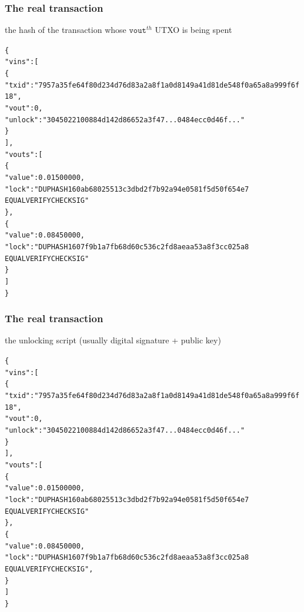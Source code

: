 \documentclass[11pt]{beamer}  %
\begin{document}
\begin{frame}[fragile]\frametitle{The real transaction}

  \begin{center}
    the hash of the transaction whose $\mathtt{vout}^{\mathit{th}}$ UTXO is being spent
  \end{center}

  {\scriptsize\begin{alltt}
\{
  "vins": [
    \{
      \alert{"txid": "7957a35fe64f80d234d76d83a2a8f1a0d8149a41d81de548f0a65a8a999f6f18",
      "vout": 0},
      "unlock": "3045022100884d142d86652a3f47... 0484ecc0d46f..."
    \}
  ],
  "vouts": [
    \{
      "value": 0.01500000,
      "lock": "DUP HASH160 ab68025513c3dbd2f7b92a94e0581f5d50f654e7
               EQUALVERIFY CHECKSIG"
    \},
    \{
      "value": 0.08450000,
      "lock": "DUP HASH160 7f9b1a7fb68d60c536c2fd8aeaa53a8f3cc025a8
               EQUALVERIFY CHECKSIG"
    \}
  ]
\}
\end{alltt}}

\end{frame}

\begin{frame}[fragile]\frametitle{The real transaction}

  \begin{center}
    the unlocking script (usually digital signature + public key)
  \end{center}

  {\scriptsize\begin{alltt}
\{
  "vins": [
    \{
      "txid": "7957a35fe64f80d234d76d83a2a8f1a0d8149a41d81de548f0a65a8a999f6f18",
      "vout": 0,
      \alert{"unlock": "3045022100884d142d86652a3f47... 0484ecc0d46f..."}
    \}
  ],
  "vouts": [
    \{
      "value": 0.01500000,
      "lock": "DUP HASH160 ab68025513c3dbd2f7b92a94e0581f5d50f654e7
               EQUALVERIFY CHECKSIG"
    \},
    \{
      "value": 0.08450000,
      "lock": "DUP HASH160 7f9b1a7fb68d60c536c2fd8aeaa53a8f3cc025a8
               EQUALVERIFY CHECKSIG",
    \}
  ]
\}
\end{alltt}}

\end{frame}
\end{document}
